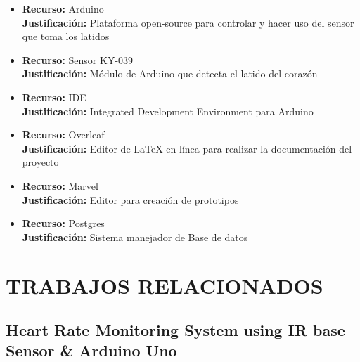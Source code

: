 \documentclass[letterpaper, 10 pt, conference]{ieeeconf}  %
\begin{document}
\begin{itemize}

    \item 
        \textbf{Recurso:} Arduino\\
        \textbf{Justificaci\'on:} Plataforma open-source para controlar y hacer uso del sensor que toma los latidos\\
        
    \item 
        \textbf{Recurso:} Sensor KY-039\\
        \textbf{Justificaci\'on:} M\'odulo de Arduino que detecta el latido del coraz\'on\\
        
    \item 
        \textbf{Recurso:} IDE\\
        \textbf{Justificaci\'on:} Integrated Development Environment para Arduino\\
        
    \item 
        \textbf{Recurso:} Overleaf\\
        \textbf{Justificaci\'on:} Editor de LaTeX en l\'inea para realizar la documentaci\'on del proyecto\\
    
    \item 
        \textbf{Recurso:} Marvel\\
        \textbf{Justificaci\'on:} Editor para creaci\'on de prototipos\\
        
     \item 
        \textbf{Recurso:} Postgres\\
        \textbf{Justificaci\'on:} Sistema manejador de Base de datos\\
        
\end{itemize}



\section{TRABAJOS RELACIONADOS}

\subsection{Heart Rate Monitoring System using IR base Sensor \& Arduino Uno  \cite{c7}}
\end{document}
